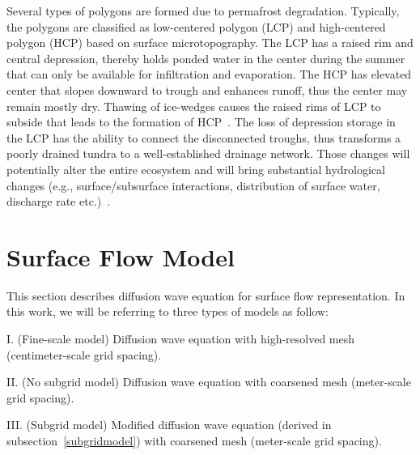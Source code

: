 \documentclass[review,11pt]{elsarticle}
\begin{document}
Several types of polygons are formed due to permafrost degradation. Typically, the polygons are classified as low-centered polygon (LCP) and high-centered polygon (HCP) based on surface microtopography. The LCP has a raised rim and central depression, thereby holds ponded water in the center during the summer that can only be available for infiltration and evaporation. The HCP has elevated center that slopes downward to trough and enhances runoff, thus the center may remain mostly dry. 
Thawing of ice-wedges causes the raised rims of LCP to subside that leads to the formation of HCP~\cite{jorgenson2006abrupt}. The loss of depression storage in the LCP has the ability to connect the disconnected troughs, thus transforms a poorly drained tundra to a well-established drainage network. Those changes will potentially alter the entire ecosystem and will bring substantial hydrological changes (e.g., surface/subsurface interactions, distribution of surface water, discharge rate etc.)~\cite{liljedahl2016pan, hinzman2005evidence,rowland2010arctic,liljedahl2012ice}.



\section{Surface Flow Model}
This section describes diffusion wave equation for surface flow representation. In this work, we will be referring to three types of models as follow:
\begin{description}\itemsep0pt \parskip0pt
\item I. (Fine-scale model) Diffusion wave equation with high-resolved mesh (centimeter-scale grid spacing).
\item II. (No subgrid model) Diffusion wave equation with coarsened mesh (meter-scale grid spacing).
\item III. (Subgrid model) Modified diffusion wave equation (derived in subsection~\ref{subgridmodel}) with coarsened mesh (meter-scale grid spacing).
\end{description}
\end{document}
